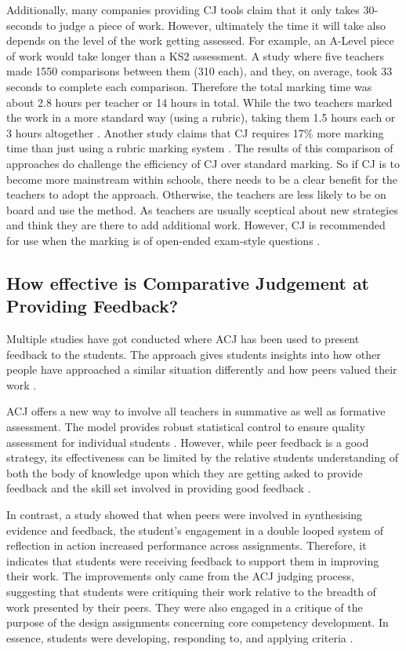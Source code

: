 		Additionally, many companies providing CJ tools claim that it only takes  30-seconds to judge a piece of work. However, ultimately the time it will take also depends on the level of the work getting assessed. For example, an A-Level piece of work would take longer than a KS2 assessment. A study where five teachers made 1550 comparisons between them (310 each), and they, on average, took 33 seconds to complete each comparison. Therefore the total marking time was about 2.8 hours per teacher or 14 hours in total. While the two teachers marked the work in a more standard way (using a rubric), taking them 1.5 hours each or 3 hours altogether \cite{mcmahon2015comparative}. Another study claims that CJ requires 17\% more marking time than just using a rubric marking system \cite{steedle2016evaluating}. The results of this comparison of approaches do challenge the efficiency of CJ over standard marking. So if CJ is to become more mainstream within schools, there needs to be a clear benefit for the teachers to adopt the approach. Otherwise, the teachers are less likely to be on board and use the method. As teachers are usually sceptical about new strategies and think they are there to add additional work. However, CJ is recommended for use when the marking is of open-ended exam-style questions \cite{steedle2016evaluating}.
	

	\subsection{How effective is Comparative Judgement at Providing Feedback?} %
		Multiple studies have got conducted where ACJ has been used to present feedback to the students. The approach gives students insights into how other people have approached a similar situation differently and how peers valued their work \cite{seery2012validity}. 
		
		ACJ offers a new way to involve all teachers in summative as well as formative assessment. The model provides robust statistical control to ensure quality assessment for individual students \cite{pollitt2012method}. However, while peer feedback is a good strategy, its effectiveness can be limited by the relative students understanding of both the body of knowledge upon which they are getting asked to provide feedback and the skill set involved in providing good feedback \cite{potter2017compair}.
		
		In contrast, a study showed that when peers were involved in synthesising evidence and feedback, the student's engagement in a double looped system of reflection in action increased performance across assignments. Therefore, it indicates that students were receiving feedback to support them in improving their work. The improvements only came from the ACJ judging process, suggesting that students were critiquing their work relative to the breadth of work presented by their peers. They were also engaged in a critique of the purpose of the design assignments concerning core competency development. In essence, students were developing, responding to, and applying criteria \cite{seery2019integrating}.
		

